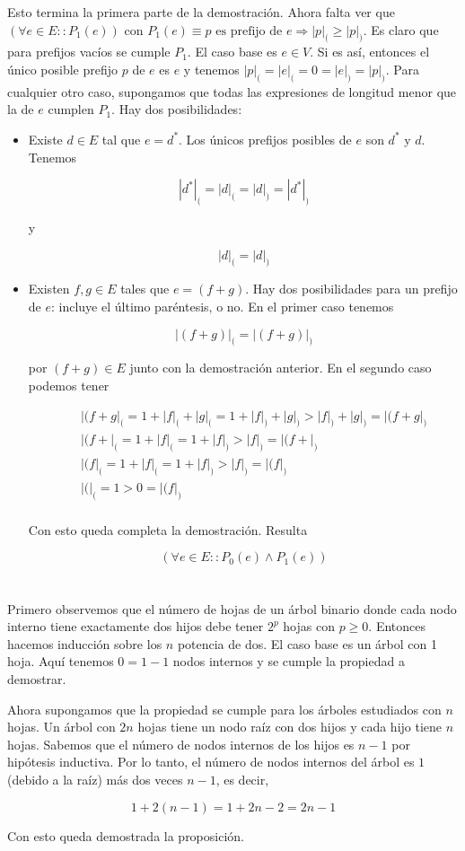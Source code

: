 \documentclass{article}
\begin{document}
Esto termina la primera parte de la demostración. Ahora falta ver que
$(\forall e \in E :: P_1(e))$
con
$P_1(e) \equiv p \text{ es prefijo de } e \Rightarrow |p|_( \geq |p|_)$.
Es claro que para prefijos vacíos se cumple $P_1$.
El caso base es $e \in V$. Si es así, entonces el único posible prefijo $p$ de
$e$ es $e$ y tenemos $|p|_( = |e|_( = 0 = |e|_) = |p|_)$. Para cualquier otro
caso, supongamos que todas las expresiones de longitud menor que la de $e$
cumplen $P_1$. Hay dos posibilidades:

\begin{itemize}

\item Existe $d \in E$ tal que $e = d^*$. Los únicos prefijos posibles de $e$
son $d^*$ y $d$. Tenemos

$$|d^*|_( = |d|_( = |d|_) = |d^*|_)$$

y

$$|d|_( = |d|_)$$

\item Existen $f,g \in E$ tales que $e = (f+g)$. Hay dos posibilidades para un
prefijo de $e$: incluye el último paréntesis, o no. En el primer caso tenemos

$$
|(f+g)|_( = |(f+g)|_)
$$

por $(f+g) \in E$ junto con la demostración anterior. En el segundo caso podemos
tener

\begin{eqnarray*}
& & |(f+g|_( = 1 + |f|_( + |g|_( = 1 + |f|_) + |g|_) > |f|_) + |g|_) = |(f+g|_) \\
& & |(f+|_( = 1 + |f|_( = 1 + |f|_) > |f|_) = |(f+|_) \\
& & |(f|_( = 1 + |f|_( = 1 + |f|_) > |f|_) = |(f|_) \\
& & |(|_( = 1 > 0 = |(f|_) \\
\end{eqnarray*}

Con esto queda completa la demostración. Resulta

$$(\forall e \in E :: P_0(e) \wedge P_1(e))$$

\end{itemize}

\section{}

Primero observemos que el número de hojas de un árbol binario donde cada nodo
interno tiene exactamente dos hijos debe tener $2^p$ hojas con $p \geq 0$.
Entonces hacemos inducción sobre los $n$ potencia de dos. El caso base es un
árbol con 1 hoja. Aquí tenemos $0 = 1 - 1$ nodos internos y se cumple la
propiedad a demostrar.

Ahora supongamos que la propiedad se cumple para los
árboles estudiados con $n$ hojas. Un árbol con $2n$ hojas tiene un nodo raíz
con dos hijos y cada hijo tiene $n$ hojas. Sabemos que el número de nodos
internos de los
hijos es $n-1$ por hipótesis inductiva. Por lo tanto, el número de
nodos internos del árbol es $1$ (debido a la raíz) más dos veces $n-1$,
es decir,

$$
1+2(n-1) = 1 + 2n - 2 = 2n - 1
$$

Con esto queda demostrada la proposición.
\end{document}
